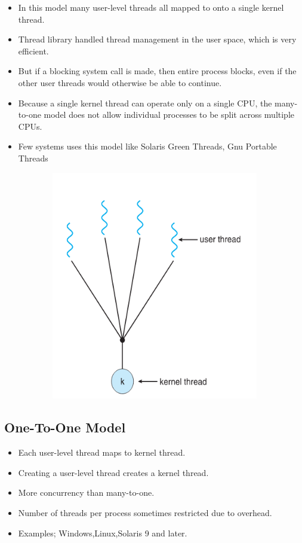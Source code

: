 \documentclass[12pt]{extarticle}
\begin{document}
\begin{itemize}
    \item In this model many user-level threads all mapped to onto a single kernel thread.
    \item Thread library handled thread management in the user space, which is very efficient.
    \item But if a blocking system call is made, then entire process blocks, even if the other user threads would otherwise be able to continue.
    \item Because a single kernel thread can operate only on a single CPU, the many-to-one model does not allow individual processes to be split across multiple CPUs.
    \item Few systems uses this model like Solaris Green Threads, Gnu Portable Threads
\end{itemize}

\begin{center}

    \includegraphics[width=15cm, height=10cm]{many-to-one}
     
\end{center} 

\subsection{One-To-One Model}

\begin{itemize}
    \item Each user-level thread maps to kernel thread.
    \item Creating a user-level thread creates a kernel thread.
    \item More concurrency than many-to-one.
    \item Number of threads per process sometimes restricted due to overhead.
    \item Examples; Windows,Linux,Solaris 9 and later.
\end{itemize}
\end{document}
